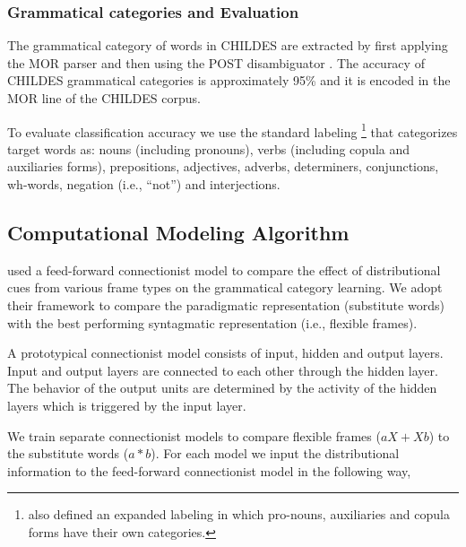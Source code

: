 \subsubsection{Grammatical categories and Evaluation}
The grammatical category of words in CHILDES are extracted by first
applying the MOR parser \citep*{macwhinney2000childes} and then using
the POST disambiguator \citep*{sagae2004automatic}.  The accuracy of
CHILDES grammatical categories is approximately 95\%
\citep*{parisse2000automatic} and it is encoded in the MOR line of the
CHILDES corpus.

To evaluate classification accuracy we use the standard labeling
\citep*{Mintz200391}\footnote{\cite{Mintz200391} also defined an expanded
labeling in which pro-nouns, auxiliaries and copula forms have their own
categories.} that categorizes target words as: nouns (including pronouns), verbs
(including copula and auxiliaries forms), prepositions, adjectives, adverbs,
determiners, conjunctions, wh-words, negation (i.e., ``not'') and
interjections.



\subsection{Computational Modeling Algorithm}
\label{s:computational}
\cite{clair2010} used a feed-forward connectionist model to compare
the effect of distributional cues from various frame types on the
grammatical category learning.  We adopt their framework to compare the
paradigmatic representation (substitute words) with the best performing
syntagmatic representation (i.e., flexible frames).

A prototypical connectionist model consists of input, hidden and
output layers.  Input and output layers are connected to each other
through the hidden layer.  The behavior of the output units are
determined by the activity of the hidden layers which is triggered by
the input layer.

We train separate connectionist models to compare flexible frames ($aX+Xb$) to
the substitute words ($a*b$).  For each model we input the distributional
information to the feed-forward connectionist model in the following way,


